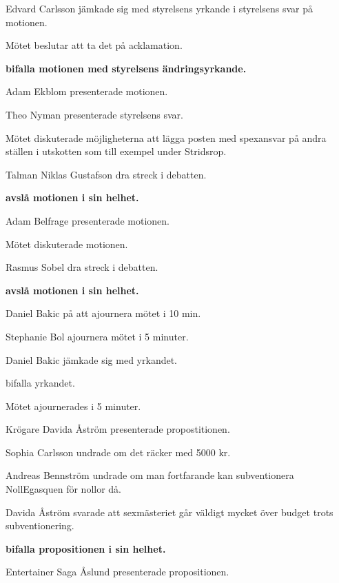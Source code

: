 \documentclass[10pt]{article}
\begin{document}
\begin{paragrafer}
\begin{paragrafer}
    Edvard Carlsson jämkade sig med styrelsens yrkande i styrelsens svar på motionen.

    Mötet beslutar att ta det på acklamation.

    \textbf{\Mba bifalla motionen med styrelsens ändringsyrkande.}

    Adam Ekblom presenterade motionen.

    Theo Nyman presenterade styrelsens svar. 

    Mötet diskuterade möjligheterna att lägga posten med spexansvar på andra ställen i utskotten som 
        till exempel under Stridsrop. 
    
    Talman Niklas Gustafson \ypa dra streck i debatten. 

    \textbf{\Mba avslå motionen i sin helhet. }

    Adam Belfrage presenterade motionen.

    Mötet diskuterade motionen.

    Rasmus Sobel \ypa dra streck i debatten.

    \Mbaby

    \textbf{\Mba avslå motionen i sin helhet.}

    Daniel Bakic \ypa på att ajournera mötet i 10 min.

    Stephanie Bol \ypa ajournera mötet i 5 minuter.

    Daniel Bakic jämkade sig med yrkandet.

    \Mba bifalla yrkandet.

    Mötet ajournerades i 5 minuter.

\end{paragrafer}
    \begin{paragrafer}
      Krögare Davida Åström presenterade propostitionen.

      Sophia Carlsson undrade om det räcker med 5000 kr.

      Andreas Bennström undrade om man fortfarande kan subventionera NollEgasquen för nollor då.

      Davida Åström svarade att sexmästeriet går väldigt mycket över budget trots subventionering.

      \textbf{\Mba bifalla propositionen i sin helhet.}

      Entertainer Saga Åslund presenterade propositionen.


\end{paragrafer}
\end{paragrafer}
\end{document}

